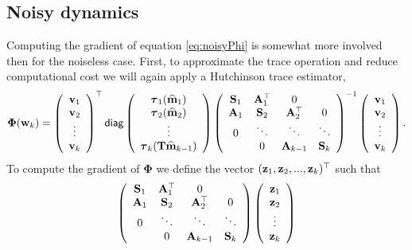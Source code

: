 \documentclass[english]{siamltex}
\newcommand{\bfA}	{{\bf{A}}}
\newcommand{\bfS}	{{\bf{S}}}
\newcommand{\bfT}	{{\bf{T}}}
\newcommand{\bfm}	{{\bf{m}}}
\newcommand{\bfv}	{{\bf{v}}}
\newcommand{\bfw}	{{\bf{w}}}
\newcommand{\bfz}	{{\bf{z}}}
\newcommand{\bfPhi}     {{\boldsymbol \Phi}}
\newcommand{\bftau}      {{\boldsymbol \tau}}
\newcommand{\bfmhat}    {{\widehat{\bfm}}}
\renewcommand{\bfmhat}	{\widehat{\bf m}}
\begin{document}
{\subsection{Noisy dynamics}

Computing the gradient of equation \eqref{eq:noisyPhi} is somewhat more involved then for the noiseless case. 
First, to approximate the trace operation and reduce computational cost we will again apply a Hutchinson trace estimator,
\begin{equation}
\bfPhi(\bfw_k) =  
\left(\begin{array}{c} \bfv_1 \\ \bfv_2\\ \vdots\\ \bfv_k \end{array}\right)^{\top}
{\sf diag}
\left( \begin{array}{c}
\bftau_1(\bfmhat_1) \\ 
\bftau_2(\bfmhat_2)  \\
\vdots \\
\bftau_k(\bfT\bfmhat_{k-1})\end{array}\right)
\left(\begin{array}{cccc}
 \bfS_1 &  \bfA^{\top}_1 & 0 & \\
 \bfA_1 & \bfS_2 & \bfA^{\top}_2 & 0 \\
 0 & \ddots & \ddots & \ddots \\
 & 0 & \bfA_{k-1} & \bfS_k
  \end{array}\right)^{-1}
  \left(\begin{array}{c} \bfv_1 \\ \bfv_2\\ \vdots\\ \bfv_k \end{array}\right).
\end{equation}
To compute the gradient of $\bfPhi$ we define the vector  $(\bfz_1,\bfz_2,...,\bfz_k)^{\top}$ such that
\begin{equation}
\left(\begin{array}{cccc}
 \bfS_1 &  \bfA^{\top}_1 & 0 & \\
 \bfA_1 & \bfS_2 & \bfA^{\top}_2 & 0 \\
 0 & \ddots & \ddots & \ddots \\
 & 0 & \bfA_{k-1} & \bfS_k
  \end{array}\right)
  \left(\begin{array}{c} \bfz_1 \\ \bfz_2\\ \vdots\\ \bfz_k \end{array}\right)

\end{equation}}
\end{document}
